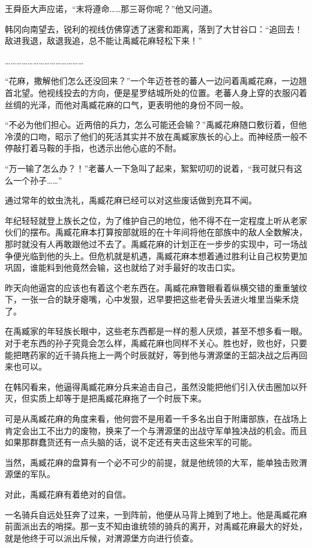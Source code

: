 王舜臣大声应诺，“末将遵命……那三哥你呢？”他又问道。

韩冈向南望去，锐利的视线仿佛穿透了迷雾和距离，落到了大甘谷口：“追回去！敌进我退，敌退我追，总不能让禹臧花麻轻松下来！”

……………………………………

“花麻，撒解他们怎么还没回来？”一个年迈苍苍的蕃人一边问着禹臧花麻，一边翘首北望。他视线投去的方向，便是星罗结城所处的位置。老蕃人身上穿的衣服闪着丝绸的光泽，而他对禹臧花麻的口气，更表明他的身份不同一般。

“不必为他们担心。近两倍的兵力，怎么可能还会输？”禹臧花麻随口敷衍着，但他冷漠的口吻，昭示了他们的死活其实并不放在禹臧家族长的心上。而神经质一般不停敲打着马鞍的手指，也透示出他心底的不耐。

“万一输了怎么办？！”老蕃人一下急叫了起来，絮絮叨叨的说着，“我可就只有这么一个孙子……”

通过常年的蚊虫洗礼，禹臧花麻已经可以对这些废话做到充耳不闻。

年纪轻轻就登上族长之位，为了维护自己的地位，他不得不在一定程度上听从老家伙们的摆布。禹臧花麻本打算按部就班的在十年间将他在部族中的敌人全数解决，那时就没有人再敢跟他过不去了。禹臧花麻的计划正在一步步的实现中，可一场战争便光临到他的头上。但危机就是机遇，禹臧花麻本想着通过胜利让自己权势更加巩固，谁能料到他竟然会输，这也就给了对手最好的攻击口实。

昨天向他逼宫的应该也有着这个老东西在。禹臧花麻瞥眼看着纵横交错的重重皱纹下，一张一合的缺牙瘪嘴，心中发狠，迟早要把这些老骨头丢进火堆里当柴禾烧了。

在禹臧家的年轻族长眼中，这些老东西都是一样的惹人厌烦，甚至不想多看一眼。对于老东西的孙子究竟会怎么样，禹臧花麻也同样不关心。胜也好，败也好，只要能把瞎药家的近千骑兵拖上一两个时辰就好，等到他与渭源堡的王韶决战之后再回来也可以。

在韩冈看来，他逼得禹臧花麻分兵来追击自己，虽然没能把他们引入伏击圈加以歼灭，但实质上却等于是把禹臧花麻拖了一个时辰下来。

可是从禹臧花麻的角度来看，他何尝不是用着一千多名出自于附庸部族，在战场上肯定会出工不出力的废物，换来了一个与渭源堡的出战守军单独决战的机会。而且如果那群蠢货还有一点头脑的话，说不定还有夹击这些宋军的可能。

当然，禹臧花麻的盘算有一个必不可少的前提，就是他统领的大军，能单独击败渭源堡的军队。

对此，禹臧花麻有着绝对的自信。

一名骑兵自远处狂奔了过来，一到阵前，他便从马背上摊到了地上。他是禹臧花麻前面派出去的哨探。那一支不知由谁统领的骑兵的离开，对禹臧花麻最大的好处，就是他终于可以派出斥候，对渭源堡方向进行侦查。


